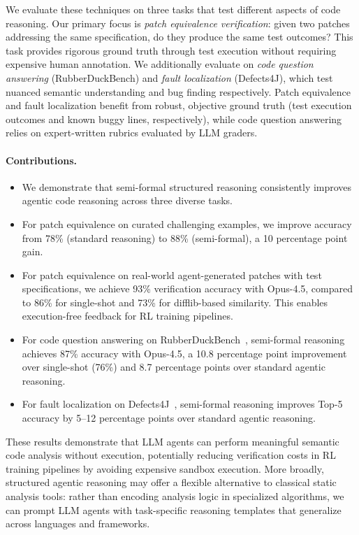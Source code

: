 \documentclass[]{meta}
\begin{document}
We evaluate these techniques on three tasks that test different aspects of code reasoning.
Our primary focus is \emph{patch equivalence verification}: given two patches addressing the same specification, do they produce the same test outcomes? This task provides rigorous ground truth through test execution without requiring expensive human annotation.
We additionally evaluate on \emph{code question answering} (RubberDuckBench) and \emph{fault localization} (Defects4J), which test nuanced semantic understanding and bug finding respectively.
Patch equivalence and fault localization benefit from robust, objective ground truth (test execution outcomes and known buggy lines, respectively), while code question answering relies on expert-written rubrics evaluated by LLM graders.

\paragraph{Contributions.}
\begin{itemize}[noitemsep]
    \item We demonstrate that semi-formal structured reasoning consistently improves agentic code reasoning across three diverse tasks.

    \item For patch equivalence on curated challenging examples, we improve accuracy from 78\% (standard reasoning) to 88\% (semi-formal), a 10 percentage point gain.

    \item For patch equivalence on real-world agent-generated patches with test specifications, we achieve 93\% verification accuracy with Opus-4.5, compared to 86\% for single-shot and 73\% for difflib-based similarity. This enables execution-free feedback for RL training pipelines.

    \item For code question answering on RubberDuckBench~\cite{rubberduckbench}, semi-formal reasoning achieves 87\% accuracy with Opus-4.5, a 10.8 percentage point improvement over single-shot (76\%) and 8.7 percentage points over standard agentic reasoning.

    \item For fault localization on Defects4J~\cite{just2014defects4j}, semi-formal reasoning improves Top-5 accuracy by 5--12 percentage points over standard agentic reasoning.
\end{itemize}

These results demonstrate that LLM agents can perform meaningful semantic code analysis without execution, potentially reducing verification costs in RL training pipelines by avoiding expensive sandbox execution. More broadly, structured agentic reasoning may offer a flexible alternative to classical static analysis tools: rather than encoding analysis logic in specialized algorithms, we can prompt LLM agents with task-specific reasoning templates that generalize across languages and frameworks.
\end{document}

